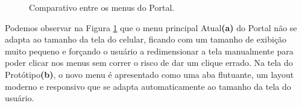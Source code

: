 \documentclass[12pt]{article}
\begin{document}
\begin{figure}[!htb]
  \caption{Comparativo entre os menus do Portal.}
  \label{figura16}
\end{figure}
Podemos observar na Figura \ref{figura16} que o menu principal Atual\textbf{(a)} do Portal não se adapta ao tamanho da tela do celular, ficando com um tamanho de exibição muito pequeno e forçando o usuário a redimensionar a tela manualmente para poder clicar nos menus sem correr o risco de dar um clique errado. Na tela do Protótipo\textbf{(b)}, o novo menu é apresentado como uma aba flutuante,  um layout moderno e responsivo que se adapta automaticamente ao tamanho da tela do usuário.
\end{document}

